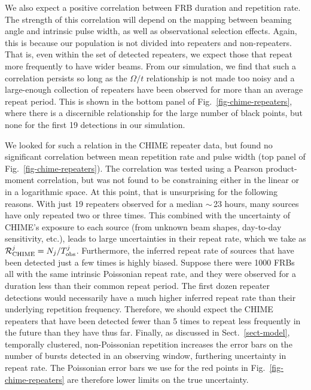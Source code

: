 \documentclass[fleqn,usenatbib]{mnras}
\begin{document}
We also expect a positive correlation between FRB duration and 
repetition rate. The strength of this correlation will depend 
on the mapping between beaming angle and intrinsic pulse width, as well as observational selection 
effects. Again, this is because our population is not 
divided into repeaters and non-repeaters. That is, 
even within the set of detected repeaters, we expect 
those that repeat more frequently to have wider beams.
From our simulation, we find that such a correlation persists 
so long as the $\Omega/t$ relationship is not made too noisy 
and a large-enough collection of repeaters have been observed for 
more than an average repeat period. This is shown in the bottom 
panel of Fig.~\ref{fig-chime-repeaters}, where 
there is a discernible relationship for the large number 
of black points, but none for the first 19 detections
in our simulation.

We looked for such a relation in the CHIME repeater data, 
but found no significant correlation between mean repetition rate and pulse width (top panel of Fig.~\ref{fig-chime-repeaters}). The correlation was tested using a Pearson product-moment correlation, but was not found to be constraining  either in the linear or in a logarithmic space.
At this point, that is unsurprising for the following reasons. 
With just 19 repeaters observed for a median $\sim$\,23 hours, 
many sources have only repeated two or three times. This combined 
with the uncertainty of CHIME's exposure to each source (from unknown 
beam shapes, day-to-day sensitivity, etc.), 
leads to large uncertainties in their repeat rate, 
which we take as $\mathcal{R}^j_{\rm CHIME}=N_j/T^j_{\rm obs}$. Furthermore, 
the inferred repeat rate of sources that have been detected 
just a few times is highly biased. Suppose there were 1000 FRBs
all with the same intrinsic Poissonian repeat rate, and they were 
observed for a duration less than their common repeat period. 
The first dozen repeater detections would necessarily have 
a much higher inferred repeat rate than their 
underlying repetition frequency. Therefore, we should expect 
the CHIME repeaters that have been detected fewer than 5 times
to repeat less frequently in the future 
than they have thus far. Finally, 
as discussed in Sect.~\ref{sect-model}, temporally clustered, 
non-Poissonian repetition increases the error bars on 
the number of bursts detected in an observing window, furthering uncertainty in repeat rate.
The Poissonian error bars we use for the 
red points in Fig.~\ref{fig-chime-repeaters} are therefore 
lower limits on the true uncertainty.
\end{document}
